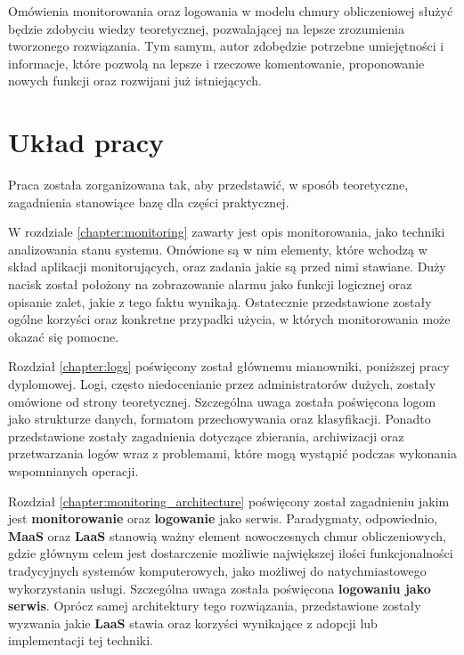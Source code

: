 Omówienia monitorowania oraz logowania w modelu chmury obliczeniowej służyć będzie zdobyciu wiedzy
teoretycznej, pozwalającej na lepsze zrozumienia tworzonego rozwiązania. Tym samym, autor zdobędzie potrzebne umiejętności i informacje, 
które pozwolą na lepsze i rzeczowe komentowanie, proponowanie nowych funkcji oraz rozwijani już istniejących.  

\section{Układ pracy}
Praca została zorganizowana tak, aby przedstawić, w sposób teoretyczne,
zagadnienia stanowiące bazę dla części praktycznej.

W rozdziale \ref{chapter:monitoring} zawarty jest opis monitorowania, jako techniki
analizowania stanu systemu. Omówione są w nim elementy, które wchodzą w skład aplikacji
monitorujących, oraz zadania jakie są przed nimi stawiane. Duży nacisk został położony
na zobrazowanie alarmu jako funkcji logicznej oraz opisanie zalet, jakie z tego faktu
wynikają. Ostatecznie przedstawione zostały ogólne korzyści oraz konkretne przypadki użycia,
w których monitorowania może okazać się pomocne.

Rozdział \ref{chapter:logs} poświęcony został głównemu mianowniki, poniższej pracy dyplomowej.
Logi, często niedocenianie przez administratorów dużych, zostały omówione od strony teoretycznej. Szczególna uwaga została poświęcona logom jako strukturze danych, formatom 
przechowywania oraz klasyfikacji. Ponadto przedstawione zostały zagadnienia dotyczące
zbierania, archiwizacji oraz przetwarzania logów wraz z problemami, które mogą wystąpić 
podczas wykonania wspomnianych operacji.

Rozdział \ref{chapter:monitoring_architecture} poświęcony został zagadnieniu jakim jest
\textbf{monitorowanie} oraz \textbf{logowanie} jako serwis. Paradygmaty, odpowiednio,
\textbf{MaaS} oraz \textbf{LaaS} stanowią ważny element nowoczesnych chmur obliczeniowych,
gdzie głównym celem jest dostarczenie możliwie największej ilości funkcjonalności tradycyjnych
systemów komputerowych, jako możliwej do natychmiastowego wykorzystania usługi. Szczególna uwaga została poświęcona \textbf{logowaniu jako serwis}. Oprócz samej architektury tego
rozwiązania, przedstawione zostały wyzwania jakie \textbf{LaaS} stawia oraz korzyści wynikające
z adopcji lub implementacji tej techniki.

